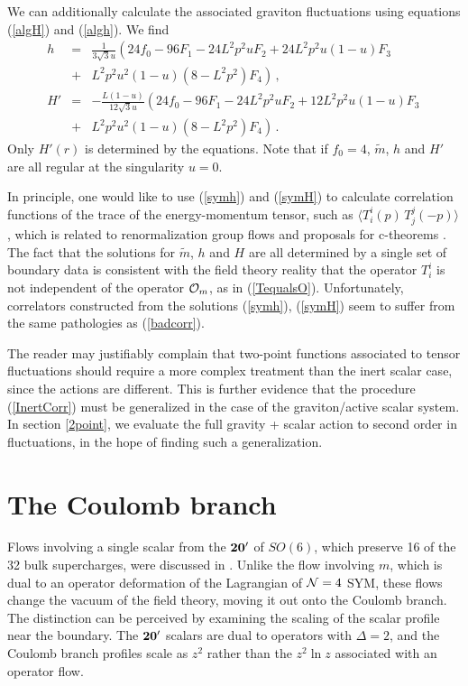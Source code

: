 \documentclass[a4paper,12pt]{article}
\def\mt{\tilde{m}}
\begin{document}
We can additionally calculate the associated graviton fluctuations using
equations (\ref{algH}) and (\ref{algh}).  We find
\begin{eqnarray}
\label{symh}
h &=& \frac{1}{3 \sqrt{3} u} \left( 24f_0 - 96 F_1 - 24 L^2 p^2 u
F_2 +24 L^2 p^2 u (1-u) F_3 \,  \right. \\ &+& \left.  L^2 p^2 u^2 (1-u)
(8 - L^2 p^2) F_4 \right) \,, \nonumber \\ \label{symH} H' &=& -
\frac{L(1-u)}{12 \sqrt{3} u} \left( 24f_0 - 96 F_1 - 24 L^2 p^2 u F_2
+12 L^2 p^2 u (1-u) F_3 \,  \right. \\ &+& \left.  L^2 p^2 u^2 (1-u) (8 -
L^2 p^2) F_4 \right) \,. \nonumber
\end{eqnarray}
Only $H'(r)$ is determined by the equations.  Note that if $f_0 = 4$,
$\mt$, $h$ and $H'$ are all regular at the singularity $u = 0$.

In principle, one would like to use (\ref{symh}) and (\ref{symH}) to
calculate correlation functions of the trace of the energy-momentum
tensor, such as $\langle T^{i}_i(p) \,T^j_j(-p)\rangle$, which is related to
renormalization group flows and proposals for c-theorems
\cite{anselmi}.  The fact that the solutions for $\mt$, $h$ and $H$
are all determined by a single set of boundary data is consistent with
the field theory reality that the operator $T^i_i$ is not
independent of the operator ${\cal O}_m$, as in (\ref{TequalsO}).
Unfortunately, correlators constructed from the solutions
(\ref{symh}), (\ref{symH}) seem to suffer from the same pathologies as
(\ref{badcorr}).

The reader may justifiably complain that two-point functions
associated to tensor fluctuations should require a more complex
treatment than the inert scalar case, since the actions
are different.  This is further evidence that the procedure
(\ref{InertCorr}) must be generalized in the case of the
graviton/active scalar system.  In section \ref{2point}, we evaluate
the full gravity + scalar action to second order in fluctuations, in
the hope of finding such a generalization.

\section{The Coulomb branch}
\label{coulomb}

Flows involving a single scalar from the ${\bf 20'}$ of $SO(6)$,
which preserve 16 of the 32 bulk supercharges, were
discussed in \cite{fgpw2,bs}.  
Unlike the flow involving $m$, which
is dual to an operator deformation of the Lagrangian of ${\cal N} =4$
SYM, these flows change the vacuum of the field theory, moving it out
onto the Coulomb branch.  The distinction can be perceived by
examining the scaling of the scalar profile near the boundary.  The
${\bf 20'}$ scalars are dual to operators with $\Delta = 2$, and the
Coulomb branch profiles scale as $z^2$ rather than the $z^2 \ln z$
associated with an operator flow.
\end{document}
